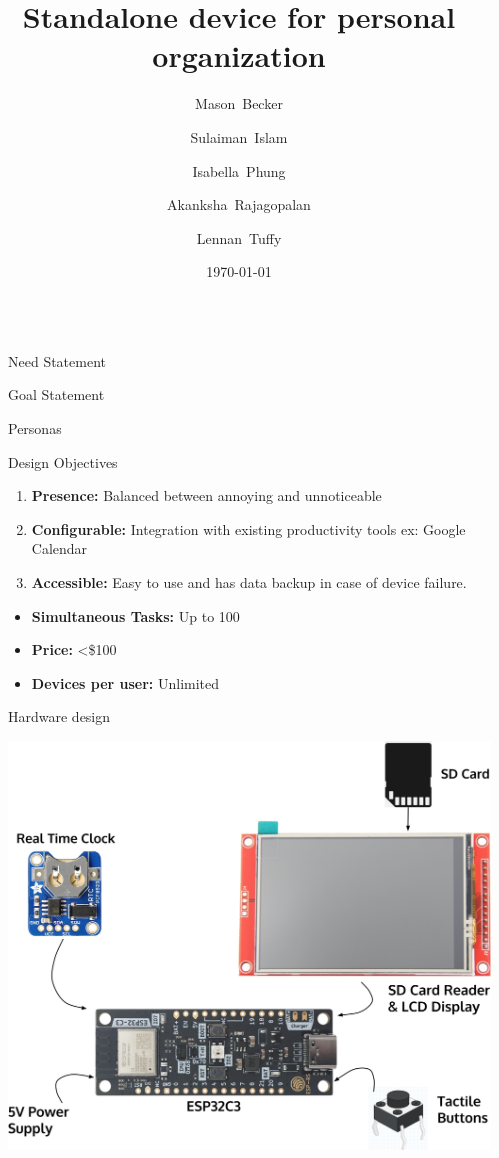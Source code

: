 \documentclass[final]{beamer}
\title{Standalone device for personal organization}
\author{
  Mason~Becker
  \and
  Sulaiman~Islam
  \and
  Isabella~Phung
  \and
  Akanksha~Rajagopalan
  \and
  Lennan~Tuffy
}
\institute[UC Santa Cruz]{CSE 123 - Supervised by Prof. David Harrison}
\date{\today}
\newlength{\sepwidth}
\newlength{\colwidth}
\newcommand{\separatorcolumn}{\begin{column}{\sepwidth}\end{column}}
\begin{document}
\begin{frame}[t]
\begin{columns}[t]
\separatorcolumn

\begin{column}{\colwidth}

  \begin{block}{Need Statement}
    
  \end{block}

  \begin{block}{Goal Statement}
    
  \end{block}

  \begin{block}{Personas} 
  \end{block}
 
  \begin{block}{Design Objectives} 
    \begin{enumerate}
        \item \textbf{Presence:} Balanced between annoying and unnoticeable
        \item \textbf{Configurable:} Integration with existing productivity tools ex: Google Calendar
        \item \textbf{Accessible:} Easy to use and has data backup in case of device failure.
    \end{enumerate}

    \begin{itemize}
        \item \textbf{Simultaneous Tasks:} Up to 100
        \item \textbf{Price:} <\$100
        \item \textbf{Devices per user:} Unlimited
    \end{itemize}

  \end{block}   

  \begin{block}{Hardware design}
    \begin{center}
      \includegraphics[width = 0.8 \linewidth]{PrototypeDesign.png}
    \end{center}
  \end{block}


\end{column}
\end{columns}
\end{frame}
\end{document}
